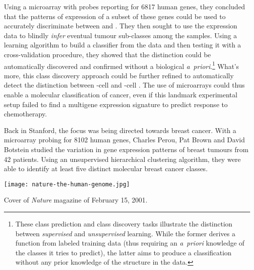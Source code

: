 Using a microarray with probes reporting for 6817 human genes, they concluded
that the patterns of expression of a subset of these genes could be used to
accurately discriminate between  and .  They then
sought to use the expression data to blindly \emph{infer} eventual tumour
\mbox{sub-classes} among the samples.  Using a learning algorithm to build a
classifier from the data and then testing it with a cross-validation procedure,
they showed that the \mbox{} distinction could be
automatically discovered and confirmed without a biological \mbox{\emph{a
    priori}}.\footnote{These class prediction and class discovery tasks
  illustrate the distinction between \emph{supervised} and \emph{unsupervised}
  learning.  While the former derives a function from labeled training data
  (thus requiring an \mbox{\emph{a priori}} knowledge of the classes it tries to
  predict), the latter aims to produce a classification without any prior
  knowledge of the structure in the data.}  What's more, this class discovery
approach could be further refined to automatically detect the distinction
between \mbox{-cell} and \mbox{-cell} .
The use of microarrays could thus enable a molecular classification of cancer,
even if this landmark experimental setup failed to find a multigene expression
signature to predict response to chemotherapy.

Back in Stanford, the focus was being directed towards breast cancer.  With a
microarray probing for \num{8102} human genes, Charles Perou, Pat Brown and
David Botstein studied the variation in gene expression patterns of breast
tumours from 42 patients.\cite{perou_molecular_2000} Using an unsupervised
hierarchical clustering algorithm, they were able to identify at least five
distinct molecular breast cancer classes.

\begin{marginfigure}%
  \texttt{[image: nature-the-human-genome.jpg]}
  \caption{Cover of \emph{Nature} magazine of February 15, 2001.}
  \label{fig:human-genome-cover}
\end{marginfigure}

